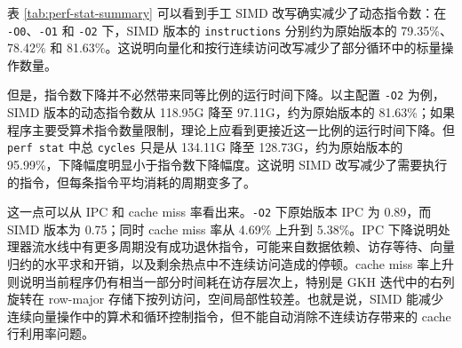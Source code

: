 \documentclass[UTF8,a4paper]{ctexart}
\begin{document}
\begin{table}[H]
  \centering
  \small
  \caption{\texttt{perf stat} 硬件事件统计}
  \label{tab:perf-stat-summary}
\end{table}

表 \ref{tab:perf-stat-summary} 可以看到手工 SIMD 改写确实减少了动态指令数：在 \texttt{-O0}、\texttt{-O1} 和 \texttt{-O2} 下，SIMD 版本的 \texttt{instructions} 分别约为原始版本的 79.35\%、78.42\% 和 81.63\%。这说明向量化和按行连续访问改写减少了部分循环中的标量操作数量。

但是，指令数下降并不必然带来同等比例的运行时间下降。以主配置 \texttt{-O2} 为例，SIMD 版本的动态指令数从 118.95G 降至 97.11G，约为原始版本的 81.63\%；如果程序主要受算术指令数量限制，理论上应看到更接近这一比例的运行时间下降。但 \texttt{perf stat} 中总 \texttt{cycles} 只是从 134.11G 降至 128.73G，约为原始版本的 95.99\%，下降幅度明显小于指令数下降幅度。这说明 SIMD 改写减少了需要执行的指令，但每条指令平均消耗的周期变多了。

这一点可以从 IPC 和 cache miss 率看出来。\texttt{-O2} 下原始版本 IPC 为 0.89，而 SIMD 版本为 0.75；同时 cache miss 率从 4.69\% 上升到 5.38\%。IPC 下降说明处理器流水线中有更多周期没有成功退休指令，可能来自数据依赖、访存等待、向量归约的水平求和开销，以及剩余热点中不连续访问造成的停顿。cache miss 率上升则说明当前程序仍有相当一部分时间耗在访存层次上，特别是 GKH 迭代中的右列旋转在 row-major 存储下按列访问，空间局部性较差。也就是说，SIMD 能减少连续向量操作中的算术和循环控制指令，但不能自动消除不连续访存带来的 cache 行利用率问题。
\end{document}
